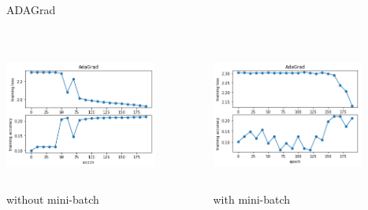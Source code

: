 \documentclass{beamer}
\begin{document}
\begin{frame}{ADAGrad}
 \begin{columns}
    \begin{column}{0.47\textwidth}
          \includegraphics[width=5cm,height=5cm,angle=0]{adagrad_mini.png}\\
          \centering
          without mini-batch
    \end{column}
    \begin{column}{0.47\textwidth}
          \includegraphics[width=5cm,height=5cm,angle=0]{adagrad.png}\\
          \centering
          with mini-batch
    \end{column}
 \end{columns}
\end{frame}
\end{document}
